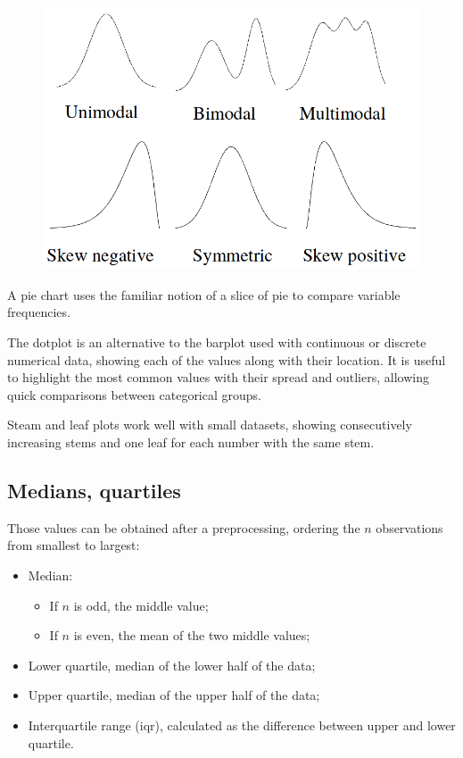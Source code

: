\begin{figure}[h]
	\centering
	\includegraphics[scale=0.4]{lectures/images/distribution-shapes.png}
\end{figure}

A pie chart uses the familiar notion of a slice of pie to compare variable frequencies.

The dotplot is an alternative to the barplot used with continuous or discrete numerical data, showing each of the values along with their location. It is useful to highlight the most common values with their spread and outliers, allowing quick comparisons between categorical groups.

Steam and leaf plots work well with small datasets, showing consecutively increasing stems and one leaf for each number with the same stem.

\subsection{Medians, quartiles}
Those values can be obtained after a preprocessing, ordering the $n$ observations from smallest to largest:
\begin{itemize}
	\item Median:
	\begin{itemize}
		\item If $n$ is odd, the middle value;
		\item If $n$ is even, the mean of the two middle values;
	\end{itemize}
	\item Lower quartile, median of the lower half of the data;
	\item Upper quartile, median of the upper half of the data;
	\item Interquartile range (iqr), calculated as the difference between upper and lower quartile.
\end{itemize}


